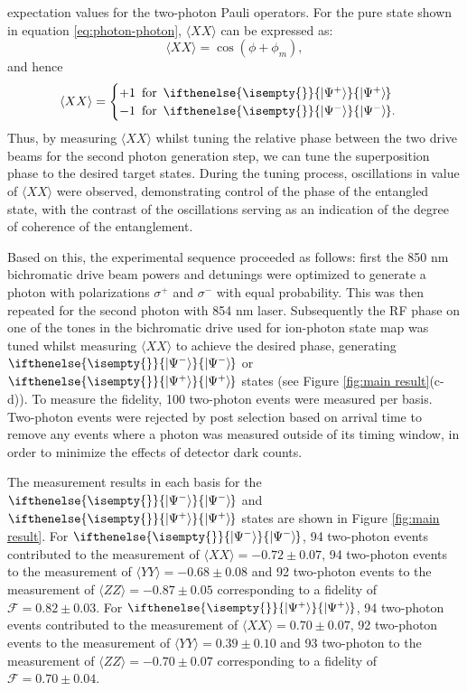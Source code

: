 \documentclass[aps,prl,twocolumn,floatfix,superscriptaddress]{revtex4-2}
\newcommand{\ket}[2][]{
	\ifthenelse{\isempty{#1}}
	{\ensuremath{\xspace\left\vert #2 \right\rangle\xspace}}
	{\ensuremath{\xspace\left\vert #2 \right\rangle_{\! #1}\xspace}}
	}
\begin{document}
expectation values for the two-photon Pauli operators.
For the pure state shown in equation \ref{eq:photon-photon}, $\langle XX\rangle$ can be expressed as:
\begin{equation}
    \langle XX\rangle=\cos (\phi+\phi_m),
\end{equation}
and hence
\begin{equation}
   \langle XX\rangle=\begin{cases}
       +1 \:\;\text{for}\:\; \ket{\Psi^{+}}\\
       -1 \:\;\text{for}\:\; \ket{\Psi^{-}}.
   \end{cases}
\end{equation}
Thus, by measuring $\langle XX\rangle$ whilst tuning the relative phase between the two drive beams for the second photon generation step, we can tune the superposition phase to the desired target states. During the tuning process, oscillations in value of $\langle XX\rangle$ were observed, demonstrating control of the phase of the entangled state, with the contrast of the oscillations serving as an indication of the degree of coherence of the entanglement.

Based on this, the experimental sequence proceeded as follows:
first the 850 nm bichromatic drive beam powers and detunings were optimized to generate a photon with polarizations $\sigma^+$ and $\sigma^-$ with equal probability. This was then repeated for the second photon with 854 nm laser. Subsequently the RF phase on one of the tones in the bichromatic drive used for ion-photon state map was tuned whilst measuring $\langle XX\rangle$ to achieve the desired phase, generating $\ket{\Psi^{-}}$ or $\ket{\Psi^{+}}$ states (see Figure \ref{fig:main result}(c-d)). To measure the fidelity, 100 two-photon events were measured per basis. Two-photon events were rejected by post selection based on arrival time to remove any events where a photon was measured outside of its timing window, in order to minimize the effects of detector dark counts.

The measurement results in each basis for the $\ket{\Psi^{-}}$ and $\ket{\Psi^{+}}$ states are shown in Figure \ref{fig:main result}. For $\ket{\Psi^{-}}$, 94 two-photon events contributed to the measurement of $\langle XX\rangle=-0.72 \pm 0.07$, 94 two-photon events to the measurement of $\langle YY\rangle=-0.68 \pm 0.08$ and 92 two-photon events to the measurement of $\langle ZZ\rangle= -0.87 \pm 0.05$ corresponding to a fidelity of $\mathcal{F}= 0.82 \pm0.03$.
For $\ket{\Psi^{+}}$, 94 two-photon events contributed to the measurement of $\langle XX\rangle=0.70 \pm 0.07$, 92 two-photon events to the measurement of $\langle YY\rangle=0.39 \pm 0.10$ and 93 two-photon to the measurement of $\langle ZZ\rangle= -0.70 \pm 0.07$ corresponding to a fidelity of $\mathcal{F}=0.70 \pm 0.04$.
\end{document}
